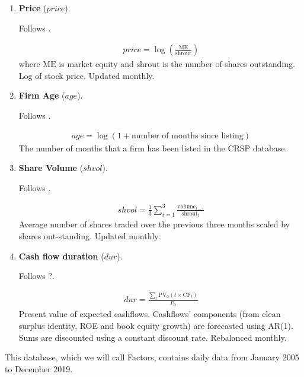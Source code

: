 \begin{enumerate}
	
	
	\item \textbf{Price} ($price$). 
	
	Follows . 
	
	\begin{align*}
		price = \log\left( \frac{ \mathrm{ME} }{ \mathrm{shrout} } \right)
	\end{align*}
	where $\mathrm{ME}$ is market equity and $\mathrm{shrout}$ is the number of shares outstanding. Log of stock price. Updated monthly.
	
	
	
	\item \textbf{Firm Age} ($age$). 
	
	Follows . 
	
	\begin{align*}
		age = \log(1 + \text{number of months since listing})
	\end{align*}
	The number of months that a firm has been listed in the CRSP database.
	
	
	
	\item \textbf{Share Volume} ($shvol$). 
	
	Follows . 
	
	\begin{align*}
		shvol = \frac{1}{3} \sum^3_{i=1} \frac{ \mathrm{volume}_{t-i} }{ \mathrm{shrout}_t }
	\end{align*}
	Average number of shares traded over the previous three months scaled by shares out-standing. Updated monthly.
	
	
	
	\item \textbf{Cash flow duration} ($dur$). 
	
	Follows ?. 
	
	\begin{align*}
		dur = \frac{ \sum_t \mathrm{PV}_0 \left( t \times \mathrm{CF}_t \right) }{ P_0 }
	\end{align*}
	Present value of expected cashflows. Cashflows' components (from clean surplus identity, ROE and book equity growth) are forecasted using AR(1). Sums are discounted using a constant discount rate. Rebalanced monthly.
		
\end{enumerate}


This database, which we will call Factors, contains daily data from January 2005 to December 2019.

